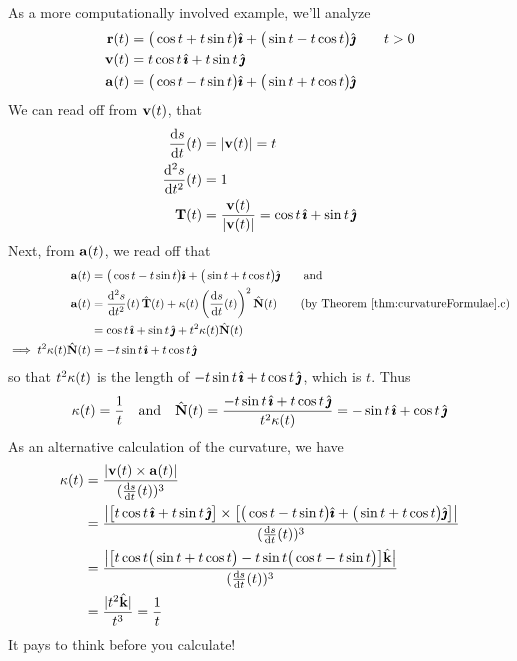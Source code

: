 \begin{eg}\label{eg:curvatureEtc}
As a more computationally involved example, we'll analyze
\begin{align*}
\mathbf{r}(t) &= \big(\cos t + t\sin t\big)\hat{\pmb{\imath}} +\big(\sin t-t\cos t\big)\hat{\pmb{\jmath}}
\qquad t>0 \\
\mathbf{v}(t) &= t\cos t\,\hat{\pmb{\imath}} + t\sin t\,\hat{\pmb{\jmath}} \\
\mathbf{a}(t) &= \big(\cos t - t\sin t\big)\hat{\pmb{\imath}} +\big(\sin t+t\cos t\big)\hat{\pmb{\jmath}} 
\end{align*}
We can read off from $\mathbf{v}(t)$, that
\begin{align*}
\diff{s}{t}(t) &= |\vv(t)| =t \\
\difftwo{s}{t}(t) &= 1 \\
\vT(t)&=\frac{\vv(t)}{|\vv(t)|} = \cos t\,\hi + \sin t\,\hj
\end{align*}
Next, from $\mathbf{a}(t)$, we read off that
\begin{align*}
\va(t) &=\big(\cos t - t\sin t\big)\hi +\big(\sin t+t\cos t\big)\hj\qquad
\text{and}  \\
\va(t)&=\difftwo{s}{t}(t)\,\hat\vT(t)
                             +\ka(t)\left(\diff{s}{t}(t)\right)^2\hat\vN(t)
\qquad\text{(by Theorem \ref{thm:curvatureFormulae}.c)} \\
&=\cos t\,\hi + \sin t\,\hj +t^2\ka(t) \hat\vN(t) \\
\implies 
t^2\ka(t) \hat\vN(t)&= - t\sin t\,\hi + t\cos t\,\hj
\end{align*}
so that $t^2\kappa(t)$ is the length of $- t\sin t\,\hat{\pmb{\imath}} + t\cos t\,\hat{\pmb{\jmath}}$, which is $t$. Thus
\begin{align*}
\kappa(t) = \frac{1}{t} \quad\text{and}\quad
\hat{\mathbf{N}}(t)= \frac{- t\sin t\,\hat{\pmb{\imath}} + t\cos t\,\hat{\pmb{\jmath}}}{t^2\kappa(t)} 
          = -\sin t\,\hat{\pmb{\imath}} + \cos t\,\hat{\pmb{\jmath}}
\end{align*}
As an alternative calculation of the curvature, we have
\begin{align*}
\ka(t)
&=\frac{|\vv(t)\times\va(t)|}{(\diff{s}{t}(t))^3} \\
&=\frac{\big|\big[t\cos t\,\hi + t\sin t\,\hj\big]\times
      \big[\big(\cos t - t\sin t\big)\hi +\big(\sin t+t\cos t\big)\hj\big]\big|}
{(\diff{s}{t}(t))^3} \\
&=\frac{\big|\big[t\cos t\big(\sin t+t\cos t\big)
                 -t\sin t\big(\cos t - t\sin t\big)\big]\hk\big|}
{(\diff{s}{t}(t))^3} \\
&=\frac{|t^2\hk|}{t^3}
=\frac{1}{t}
\end{align*}
It pays to think before you calculate!
\end{eg}

